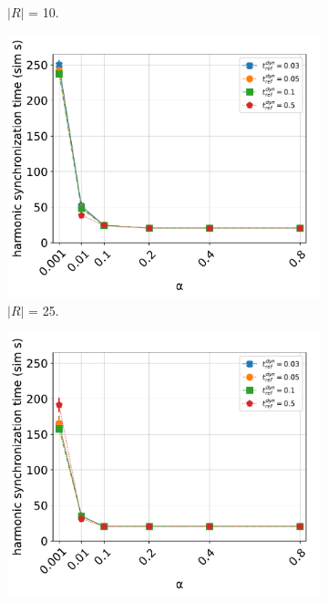 \begin{figure}[ht!]
\begin{subfigure}[b]{0.5\textwidth}
			\caption{$|R|$ = 10.}
			\label{fig:sub:t_ref_dyn_x_alpha_collsize10}
		  \end{subfigure}
		  \begin{subfigure}[b]{0.5\textwidth}
			\centering\captionsetup{width=.9\linewidth}%
			\includegraphics[width=\textwidth]{Assets/DocSegments/Chapters/ExperimentsAndResults/Figures/PerfScores/t_ref_dyn_x_alpha_hyperparamtuning_experiment_plot_collsize25.pdf}
			\caption{$|R|$ = 25.}
			\label{fig:sub:t_ref_dyn_x_alpha_collsize25}
		  \end{subfigure}
		  \begin{subfigure}[b]{0.5\textwidth}
			\centering\captionsetup{width=.9\linewidth}%
			\includegraphics[width=\textwidth]{Assets/DocSegments/Chapters/ExperimentsAndResults/Figures/PerfScores/t_ref_dyn_x_alpha_hyperparamtuning_experiment_plot_collsize50.pdf}

\end{subfigure}
\end{figure}
